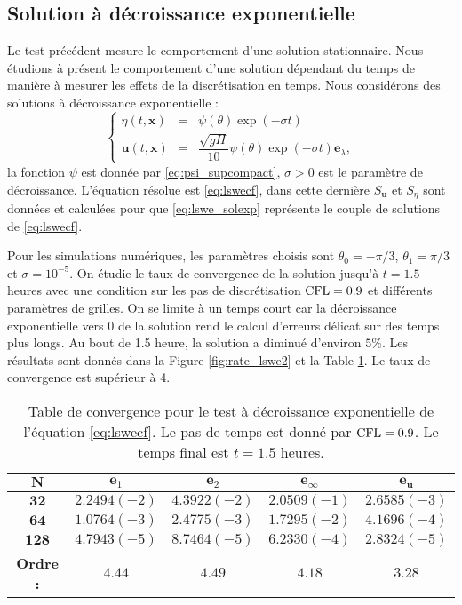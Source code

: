 \subsection{Solution à décroissance exponentielle}

Le test précédent mesure le comportement d'une solution stationnaire. Nous étudions à présent le comportement d'une solution dépendant du temps de manière à mesurer les effets de la discrétisation en temps. Nous considérons des solutions à décroissance exponentielle :
\begin{equation}
\left\lbrace
\begin{array}{rcl}
\eta(t,\mathbf{x}) & = & \psi(\theta) \exp \left( - \sigma t \right)\\
\mathbf{u}(t,\mathbf{x}) & = & \dfrac{\sqrt{gH}}{10} \psi(\theta) \exp \left( - \sigma t \right) \mathbf{e}_{\lambda},
\end{array}
\right.
\label{eq:lswe_solexp}
\end{equation}
la fonction $\psi$ est donnée par \eqref{eq:psi_supcompact}, $\sigma>0$ est le paramètre de décroissance. L'équation résolue est \eqref{eq:lswecf}, dans cette dernière $S_{\mathbf{u}}$ et $S_{\eta}$ sont données et calculées pour que \eqref{eq:lswe_solexp} représente le couple de solutions de \eqref{eq:lswecf}.

Pour les simulations numériques, les paramètres choisis sont $\theta_0 = - \pi /3$, $\theta_1 = \pi /3$ et $\sigma = 10^{-5}$. On étudie le taux de convergence de la solution jusqu'à $t=1.5$ heures avec une condition sur les pas de discrétisation $\text{CFL}=0.9$ et différents paramètres de grilles. 
On se limite à un temps court car la décroissance exponentielle vers 0 de la solution rend le calcul d'erreurs délicat sur des temps plus longs. Au bout de 1.5 heure, la solution a diminué d'environ $5\%$.
Les résultats sont donnés dans la Figure \ref{fig:rate_lswe2} et la Table \ref{tab:rate_lswe2}. Le taux de convergence est supérieur à 4.

\begin{table}[htbp]
\begin{center}
\begin{tabular}{|c||c|c|c|c|}
\hline 
$\mathbf{N}$ & $\mathbf{e}_1$ & $\mathbf{e}_2$ & $\mathbf{e}_{\infty}$ & $\mathbf{e}_{\mathbf{u}}$\\ 
\hline 
\hline 
$\mathbf{32}$ & $2.2494(-2)$ & $4.3922(-2)$ & $2.0509(-1)$ & $2.6585(-3)$\\ 

$\mathbf{64}$ & $1.0764(-3)$ & $2.4775(-3)$ & $1.7295(-2)$ & $4.1696(-4)$\\ 

$\mathbf{128}$ & $4.7943(-5)$ & $8.7464(-5)$ & $6.2330(-4)$ & $2.8324(-5)$\\

\hline
\textbf{Ordre :} & $4.44$ & $4.49$ & $4.18$ & $3.28$ \\ 
\hline
\end{tabular} 
\end{center}
\caption{Table de convergence pour le test à décroissance exponentielle de l'équation \eqref{eq:lswecf}. Le pas de temps est donné par $\text{CFL}=0.9$. Le temps final est $t=1.5$ heures.}
\label{tab:rate_lswe2}
\end{table}



